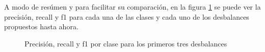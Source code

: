 A modo de resúmen y para facilitar su comparación, en la figura \ref{fig:comparaciones} se puede ver la precisión, recall y f1 para cada una de las clases y cada uno de los desbalances propuestos hasta ahora.
\begin{figure}
    \centering
    
    
    \caption{Precisión, recall y f1 por clase para los primeros tres desbalances}
    \label{fig:comparaciones}
\end{figure}

\FloatBarrier


